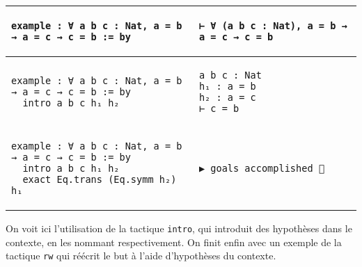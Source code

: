 \documentclass[a4paper, 12pt]{article}
\newcommand{\lean}[1]{\texttt{#1}}
\begin{document}
\vspace{\baselineskip}
\begin{tabular}{m{} | m{}}
    \begin{minipage}[t]{0.6\textwidth}
    \begin{verbatim}
example : ∀ a b c : Nat, a = b → a = c → c = b := by
    \end{verbatim}
    \end{minipage}
    &
    \begin{minipage}[t]{0.4\textwidth}
    \begin{verbatim}
⊢ ∀ (a b c : Nat), a = b → a = c → c = b
    \end{verbatim}
    \end{minipage}
    \\\hline
    \begin{minipage}[t]{0.6\textwidth}
    \begin{verbatim}
example : ∀ a b c : Nat, a = b → a = c → c = b := by
  intro a b c h₁ h₂
    \end{verbatim}
    \end{minipage}
    &
    \begin{minipage}[t]{0.4\textwidth}
    \begin{verbatim}
a b c : Nat
h₁ : a = b
h₂ : a = c
⊢ c = b
    \end{verbatim}
    \end{minipage}
    \\\hline
    \begin{minipage}[t]{0.6\textwidth}
    \begin{verbatim}
example : ∀ a b c : Nat, a = b → a = c → c = b := by
  intro a b c h₁ h₂
  exact Eq.trans (Eq.symm h₂) h₁
    \end{verbatim}
    \end{minipage}
    &
    \begin{minipage}[t]{0.4\textwidth}
    \begin{verbatim}
▶ goals accomplished 🎉
    \end{verbatim}
    \end{minipage}
\end{tabular}
\vspace{\baselineskip}

On voit ici l'utilisation de la tactique \lean{intro}, qui introduit des hypothèses dans le contexte, en les nommant respectivement. On finit enfin avec un exemple de la tactique \lean{rw} qui réécrit le but à l'aide d'hypothèses du contexte.
\end{document}
